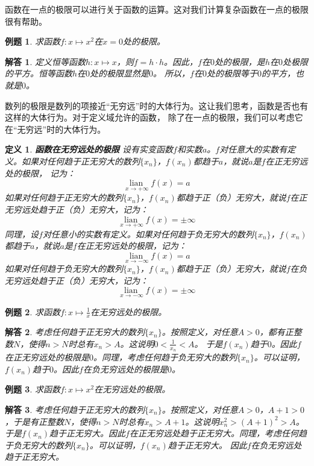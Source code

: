 \documentclass[12pt,UTF8]{ctexbook}
\newcommand\lian[1]{
    \underset{#1}{\operatorname{lian}\,}
}
\newtheorem{df}{定义}[section]
\newtheorem{et}{例题}[section]
\newtheorem*{so}{解答}
\begin{document}
函数在一点的极限可以进行关于函数的运算。这对我们计算复杂函数在一点的极限很有帮助。

\begin{et}
    求函数$f:x\mapsto x^2$在$x=0$处的极限。
\end{et}
\begin{so}
    定义恒等函数$h: x\mapsto x$，则$f = h \cdot h$。因此，$f$在$0$处的极限，是$h$在$0$处极限的平方。恒等函数$h$在$0$处的极限显然是$0$。
    所以，$f$在$0$处的极限等于$0$的平方，也就是$0$。
\end{so}

数列的极限是数列的项接近“无穷远”时的大体行为。这让我们思考，函数是否也有这样的大体行为。对于定义域允许的函数，
除了在一点的极限，我们可以考虑它在“无穷远”时的大体行为。

\begin{df}{\textbf{函数在无穷远处的极限}}
    设有实变函数$f$和实数$a$。$f$对任意大的实数有定义。如果对任何趋于正无穷大的数列$\{x_n\}$，$f(x_n)$都趋于$a$，就说$a$是$f$在正无穷远处的极限，
    记为：
    $$ \lian{x\to +\infty} f(x) = a$$
    如果对任何趋于正无穷大的数列$\{x_n\}$，$f(x_n)$都趋于正（负）无穷大，就说$f$在正无穷远处趋于正（负）无穷大，记为：
    $$ \lian{x\to +\infty} f(x) = \pm\infty$$
    同理，设$f$对任意小的实数有定义。如果对任何趋于负无穷大的数列$\{x_n\}$，$f(x_n)$都趋于$a$，就说$a$是$f$在正无穷远处的极限，记为：
    $$ \lian{x\to -\infty} f(x) = a$$
    如果对任何趋于负无穷大的数列$\{x_n\}$，$f(x_n)$都趋于正（负）无穷大，就说$f$在负无穷远处趋于正（负）无穷大，记为：
    $$ \lian{x\to -\infty} f(x) = \pm\infty$$
\end{df}

\begin{et}
    求函数$f:x\mapsto \frac{1}{x}$在无穷远处的极限。
\end{et}
\begin{so}
    考虑任何趋于正无穷大的数列$\{x_n\}$。按照定义，对任意$A>0$，都有正整数$N$，使得$n>N$时总有$x_n > A$。这说明$0 < \frac{1}{x_n} < A$。
    于是$f(x_n)$趋于$0$。因此$f$在正无穷远处的极限是$0$。同理，考虑任何趋于负无穷大的数列$\{x_n\}$。可以证明，$f(x_n)$趋于$0$。因此$f$在负无穷远处的极限是$0$。
\end{so}

\begin{et}
    求函数$f:x\mapsto x^2$在无穷远处的极限。
\end{et}
\begin{so}
    考虑任何趋于正无穷大的数列$\{x_n\}$。按照定义，对任意$A>0$，$A+1>0$，于是有正整数$N$，使得$n>N$时总有$x_n > A+1$。这说明$x_n^2 > (A+1)^2 > A$。
    于是$f(x_n)$趋于正无穷大。因此$f$在正无穷远处趋于正无穷大。同理，考虑任何趋于负无穷大的数列$\{x_n\}$。可以证明，$f(x_n)$趋于正无穷大。
    因此$f$在负无穷远处趋于正无穷大。
\end{so}
\end{document}
